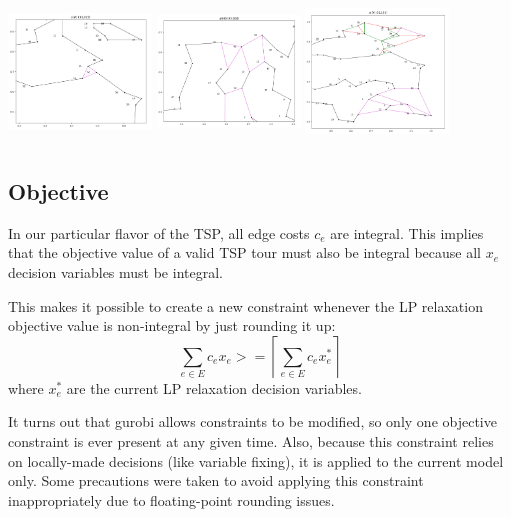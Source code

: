 \documentclass{article}
\begin{document}
\begin{flushleft}
\begin{flushleft}
\includegraphics[width=1.5in, height=1.5in]{blossom_simple}
\includegraphics[width=1.5in, height=1.5in]{blossom_medium}
\includegraphics[width=1.5in, height=1.5in]{blossom_large}

\end{flushleft}

\subsection{Objective}

In our particular flavor of the TSP,
all edge costs $c_e$ are integral.
This implies that the objective value
of a valid TSP tour
must also be integral
because all $x_e$ decision variables
must be integral.

This makes it possible
to create a new constraint
whenever the LP relaxation objective value
is non-integral by just rounding it up:
\begin{equation}
\sum_{e \in E}{c_e x_e} >= \left \lceil \sum_{e \in E}{c_e x_e^*} \right \rceil
\end{equation}
where $x_e^*$ are the current LP relaxation decision variables.

It turns out that gurobi
allows constraints to be modified,
so only one objective constraint
is ever present at any given time.
Also, because this constraint relies
on locally-made decisions
(like variable fixing),
it is applied to the current model only.
Some precautions were taken
to avoid applying this constraint inappropriately
due to floating-point rounding issues.


\end{flushleft}
\end{document}
